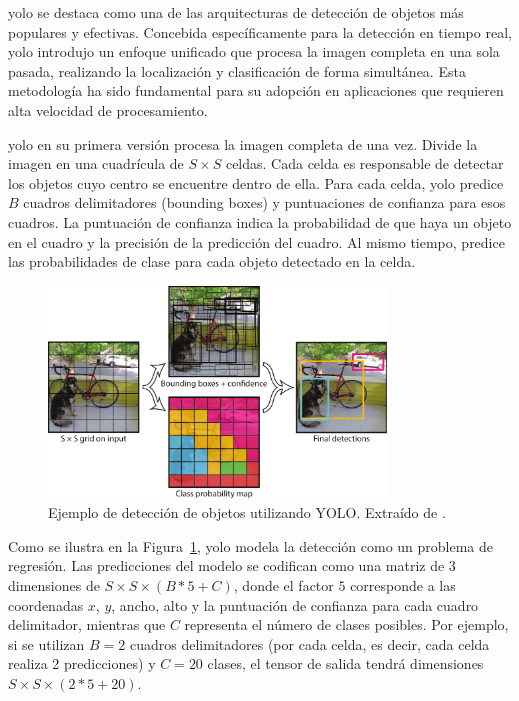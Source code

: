 \documentclass[11pt,spanish,listoffigures,listoftables]{tfgetsinf}
\begin{document}
\gls{yolo} se destaca como una de las arquitecturas de detección de objetos más populares y efectivas. Concebida específicamente para la detección en tiempo real, \gls{yolo} introdujo un enfoque unificado que procesa la imagen completa en una sola pasada, realizando la localización y clasificación de forma simultánea. Esta metodología ha sido fundamental para su adopción en aplicaciones que requieren alta velocidad de procesamiento.

\gls{yolo} en su primera versión procesa la imagen completa de una vez. Divide la imagen en una cuadrícula de $S \times S$ celdas. Cada celda es responsable de detectar los objetos cuyo centro se encuentre dentro de ella. Para cada celda, \gls{yolo} predice $B$ cuadros delimitadores (bounding boxes) y puntuaciones de confianza para esos cuadros. La puntuación de confianza indica la probabilidad de que haya un objeto en el cuadro y la precisión de la predicción del cuadro. Al mismo tiempo, predice las probabilidades de clase para cada objeto detectado en la celda.

\begin{figure}[H]
   \centering
   \includegraphics[width=0.8\textwidth]{images/estado_del_arte/yolo_detections_example.png}
   \caption[Ejemplo de detección de objetos utilizando YOLO]{Ejemplo de detección de objetos utilizando YOLO. Extraído de \cite[fig. 2, p. ~2]{redmon2016lookonceunifiedrealtime}.}
   \label{fig:yolo_detections_example}
\end{figure}

Como se ilustra en la Figura~\ref{fig:yolo_detections_example}, \gls{yolo} modela la detección como un problema de regresión. Las predicciones del modelo se codifican como una matriz de 3 dimensiones de  $S \times S \times (B * 5 + C)$, donde el factor $5$ corresponde a las coordenadas $x$, $y$, ancho, alto y la puntuación de confianza para cada cuadro delimitador, mientras que $C$ representa el número de clases posibles. Por ejemplo, si se utilizan $B=2$ cuadros delimitadores (por cada celda, es decir, cada celda realiza 2 predicciones) y $C=20$ clases, el tensor de salida tendrá dimensiones $S \times S \times (2 * 5 + 20)$. 
\end{document}
